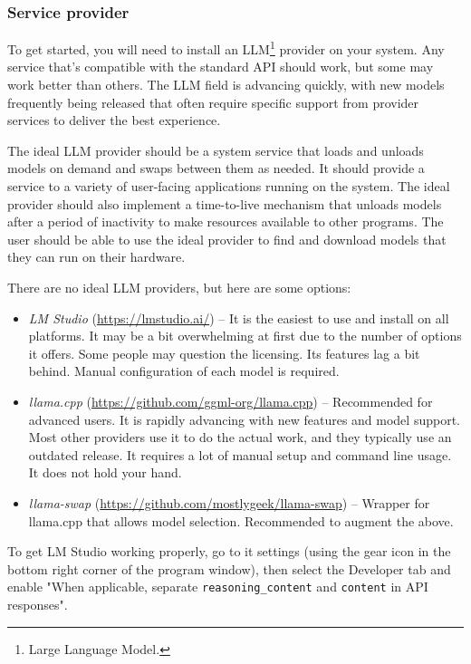 \documentclass[hidelinks,titlepage,a4paper,twoside]{article}
\begin{document}
\subsubsection{Service provider}

To get started, you will need to install an LLM\footnote{Large Language Model.} provider on your system. Any service that's compatible with the standard API should work, but some may work better than others. The LLM field is advancing quickly, with new models frequently being released that often require specific support from provider services to deliver the best experience.

The ideal LLM provider should be a system service that loads and unloads models on demand and swaps between them as needed. It should provide a service to a variety of user-facing applications running on the system. The ideal provider should also implement a time-to-live mechanism that unloads models after a period of inactivity to make resources available to other programs. The user should be able to use the ideal provider to find and download models that they can run on their hardware.

There are no ideal LLM providers, but here are some options:

\begin{itemize}
\item \emph{LM Studio} (\url{https://lmstudio.ai/}) -- It is the easiest to use and install on all platforms. It may be a bit overwhelming at first due to the number of options it offers. Some people may question the licensing. Its features lag a bit behind. Manual configuration of each model is required.
\item \emph{llama.cpp} (\url{https://github.com/ggml-org/llama.cpp}) -- Recommended for advanced users. It is rapidly advancing with new features and model support. Most other providers use it to do the actual work, and they typically use an outdated release. It requires a lot of manual setup and command line usage. It does not hold your hand.
\item \emph{llama-swap} (\url{https://github.com/mostlygeek/llama-swap}) -- Wrapper for llama.cpp that allows model selection. Recommended to augment the above.
\end{itemize}

To get LM Studio working properly, go to it settings (using the gear icon in the bottom right corner of the program window), then select the Developer tab and enable "When applicable, separate \texttt{reasoning\_content} and \texttt{content} in API responses".
\end{document}
